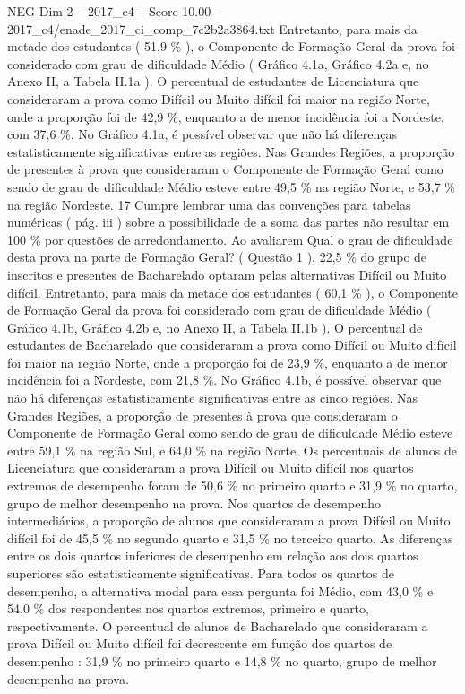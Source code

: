 \begin{textsample}{NEG Dim 2 – 2017\_c4 – Score 10.00 – 2017\_c4/enade\_2017\_ci\_comp\_7c2b2a3864.txt}
Entretanto, para mais da metade dos estudantes ( 51,9 \% ), o Componente de Formação Geral da prova foi considerado com grau de dificuldade Médio ( Gráfico 4.1a, Gráfico 4.2a e, no Anexo II, a Tabela II.1a ).
O percentual de estudantes de Licenciatura que consideraram a prova como Difícil ou Muito difícil foi maior na região Norte, onde a proporção foi de 42,9 \%, enquanto a de menor incidência foi a Nordeste, com 37,6 \%.
No Gráfico 4.1a, é possível observar que não há diferenças estatisticamente significativas entre as regiões.
Nas Grandes Regiões, a proporção de presentes à prova que consideraram o Componente de Formação Geral como sendo de grau de dificuldade Médio esteve entre 49,5 \% na região Norte, e 53,7 \% na região Nordeste. 17 Cumpre lembrar uma das convenções para tabelas numéricas ( pág. iii ) sobre a possibilidade de a soma das partes não resultar em 100 \% por questões de arredondamento.
Ao avaliarem Qual o grau de dificuldade desta prova na parte de Formação Geral? ( Questão 1 ), 22,5 \% do grupo de inscritos e presentes de Bacharelado optaram pelas alternativas Difícil ou Muito difícil.
Entretanto, para mais da metade dos estudantes ( 60,1 \% ), o Componente de Formação Geral da prova foi considerado com grau de dificuldade Médio ( Gráfico 4.1b, Gráfico 4.2b e, no Anexo II, a Tabela II.1b ).
O percentual de estudantes de Bacharelado que consideraram a prova como Difícil ou Muito difícil foi maior na região Norte, onde a proporção foi de 23,9 \%, enquanto a de menor incidência foi a Nordeste, com 21,8 \%.
No Gráfico 4.1b, é possível observar que não há diferenças estatisticamente significativas entre as cinco regiões.
Nas Grandes Regiões, a proporção de presentes à prova que consideraram o Componente de Formação Geral como sendo de grau de dificuldade Médio esteve entre 59,1 \% na região Sul, e 64,0 \% na região Norte.
Os percentuais de alunos de Licenciatura que consideraram a prova Difícil ou Muito difícil nos quartos extremos de desempenho foram de 50,6 \% no primeiro quarto e 31,9 \% no quarto, grupo de melhor desempenho na prova.
Nos quartos de desempenho intermediários, a proporção de alunos que consideraram a prova Difícil ou Muito difícil foi de 45,5 \% no segundo quarto e 31,5 \% no terceiro quarto.
As diferenças entre os dois quartos inferiores de desempenho em relação aos dois quartos superiores são estatisticamente significativas.
Para todos os quartos de desempenho, a alternativa modal para essa pergunta foi Médio, com 43,0 \% e 54,0 \% dos respondentes nos quartos extremos, primeiro e quarto, respectivamente.
O percentual de alunos de Bacharelado que consideraram a prova Difícil ou Muito difícil foi decrescente em função dos quartos de desempenho : 31,9 \% no primeiro quarto e 14,8 \% no quarto, grupo de melhor desempenho na prova.

\end{textsample}
